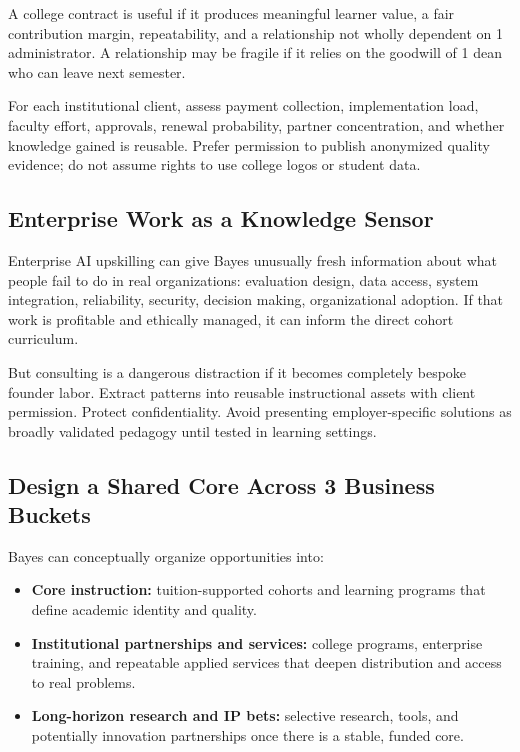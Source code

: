 A college contract is useful if it produces meaningful learner value, a fair contribution margin, repeatability, and a relationship not wholly dependent on 1 administrator. A relationship may be fragile if it relies on the goodwill of 1 dean who can leave next semester.

For each institutional client, assess payment collection, implementation load, faculty effort, approvals, renewal probability, partner concentration, and whether knowledge gained is reusable. Prefer permission to publish anonymized quality evidence; do not assume rights to use college logos or student data.

\subsection{Enterprise Work as a Knowledge Sensor}
\label{sec:enterprise_work_knowledge_sensor}

Enterprise AI upskilling can give Bayes unusually fresh information about what people fail to do in real organizations: evaluation design, data access, system integration, reliability, security, decision making, organizational adoption. If that work is profitable and ethically managed, it can inform the direct cohort curriculum.

But consulting is a dangerous distraction if it becomes completely bespoke founder labor. Extract patterns into reusable instructional assets with client permission. Protect confidentiality. Avoid presenting employer-specific solutions as broadly validated pedagogy until tested in learning settings.

\subsection{Design a Shared Core Across 3 Business Buckets}
\label{sec:shared_core_three_buckets}

Bayes can conceptually organize opportunities into:
\begin{itemize}
    \item \textbf{Core instruction:} tuition-supported cohorts and learning programs that define academic identity and quality.
    \item \textbf{Institutional partnerships and services:} college programs, enterprise training, and repeatable applied services that deepen distribution and access to real problems.
    \item \textbf{Long-horizon research and IP bets:} selective research, tools, and potentially innovation partnerships once there is a stable, funded core.
\end{itemize}

